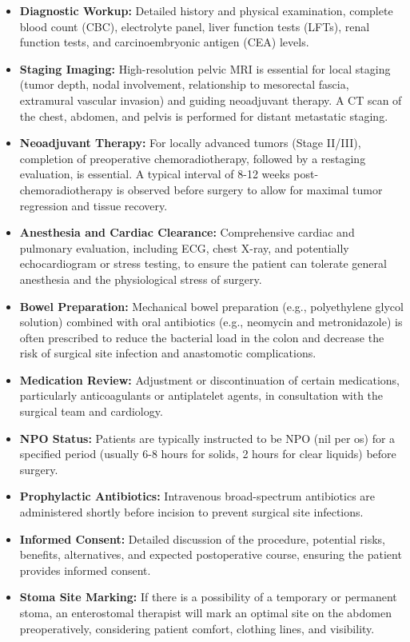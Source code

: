 \begin{itemize}
  \item \textbf{Diagnostic Workup:} Detailed history and physical examination, complete blood count (CBC), electrolyte panel, liver function tests (LFTs), renal function tests, and carcinoembryonic antigen (CEA) levels.
  
  \item \textbf{Staging Imaging:} High-resolution pelvic MRI is essential for local staging (tumor depth, nodal involvement, relationship to mesorectal fascia, extramural vascular invasion) and guiding neoadjuvant therapy. A CT scan of the chest, abdomen, and pelvis is performed for distant metastatic staging.
  
  \item \textbf{Neoadjuvant Therapy:} For locally advanced tumors (Stage II/III), completion of preoperative chemoradiotherapy, followed by a restaging evaluation, is essential. A typical interval of 8-12 weeks post-chemoradiotherapy is observed before surgery to allow for maximal tumor regression and tissue recovery.
  
  \item \textbf{Anesthesia and Cardiac Clearance:} Comprehensive cardiac and pulmonary evaluation, including ECG, chest X-ray, and potentially echocardiogram or stress testing, to ensure the patient can tolerate general anesthesia and the physiological stress of surgery.
  
  \item \textbf{Bowel Preparation:} Mechanical bowel preparation (e.g., polyethylene glycol solution) combined with oral antibiotics (e.g., neomycin and metronidazole) is often prescribed to reduce the bacterial load in the colon and decrease the risk of surgical site infection and anastomotic complications.
  
  \item \textbf{Medication Review:} Adjustment or discontinuation of certain medications, particularly anticoagulants or antiplatelet agents, in consultation with the surgical team and cardiology.
  
  \item \textbf{NPO Status:} Patients are typically instructed to be NPO (nil per os) for a specified period (usually 6-8 hours for solids, 2 hours for clear liquids) before surgery.
  
  \item \textbf{Prophylactic Antibiotics:} Intravenous broad-spectrum antibiotics are administered shortly before incision to prevent surgical site infections.
  
  \item \textbf{Informed Consent:} Detailed discussion of the procedure, potential risks, benefits, alternatives, and expected postoperative course, ensuring the patient provides informed consent.
  
  \item \textbf{Stoma Site Marking:} If there is a possibility of a temporary or permanent stoma, an enterostomal therapist will mark an optimal site on the abdomen preoperatively, considering patient comfort, clothing lines, and visibility.
\end{itemize}

